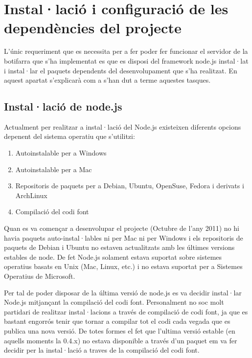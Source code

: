 \chapter{Instal·lació i configuració de les dependències del projecte}
\label{chap:dependencies}


L'únic requeriment que es necessita per a fer poder fer funcionar el servidor de la botifarra que s'ha implementat es que es disposi del framework node.js instal·lat i instal·lar el paquets dependents del desenvolupament que s'ha realitzat. En aquest apartat s'explicarà com a s'han dut a terme aquestes tasques. 

\section{Instal·lació de node.js}
\label{sec:instalacio-node}
Actualment per realitzar a instal·lació del Node.js existeixen diferents opcions depenent del sistema operatiu que s'utilitzi: 

\begin{enumerate}
    \item{Autoinstalable per a Windows}
    \item{Autoinstalable per a Mac}
    \item{Repositoris de paquets per a Debian, Ubuntu, OpenSuse, Fedora i derivats i ArchLinux}
    \item{Compilació del codi font}
\end{enumerate}

Quan es va començar a desenvolupar el projecte (Octubre de l'any 2011) no hi havia paquets auto-instal·lables ni per Mac ni per Windows i els repositoris de paquets de Debian i Ubuntu no estaven actualitzats amb les últimes versions estables de node. De fet Node.js solament estava suportat sobre sistemes operatius basats en Unix (Mac, Linux, etc.) i no estava suportat per a Sistemes Operatius de Microsoft. 

Per tal de poder disposar de la última versió de node.js es va decidir instal·lar Node.js mitjançant la compilació del codi font. Personalment no soc molt partidari de realitzar instal·lacions a través de compilació de codi font, ja que es bastant engorrós tenir que tornar a compilar tot el codi cada vegada que es publica una nova versió. De totes formes el fet que l'ultima versió estable (en aquells moments la 0.4.x) no estava disponible a través d'un paquet em va fer decidir per la instal·lació a traves de la compilació del codi font. 


